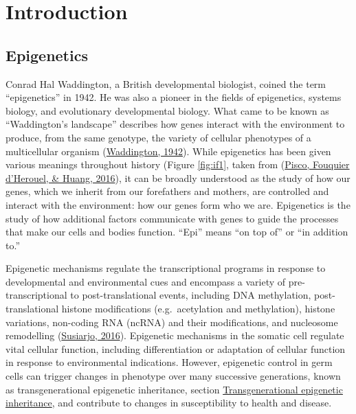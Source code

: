 \documentclass[12pt,twoside]{reedthesis}
\begin{document}
\hypertarget{intro}{%
\chapter*{Introduction}\label{intro}}

\hypertarget{epigenetics}{%
\section*{Epigenetics}\label{epigenetics}}

Conrad Hal Waddington, a British developmental biologist, coined the
term ``epigenetics'' in 1942. He was also a pioneer in the fields of
epigenetics, systems biology, and evolutionary developmental biology.
What came to be known as ``Waddington's landscape'' describes how genes
interact with the environment to produce, from the same genotype, the
variety of cellular phenotypes of a multicellular organism
(\protect\hyperlink{ref-waddington_1942}{Waddington, 1942}). While epigenetics has been given various meanings
throughout history (Figure \ref{fig:if1}, taken from (\protect\hyperlink{ref-pisco2016}{Pisco, Fouquier d'Herouel, \& Huang, 2016}), it
can be broadly understood as the study of how our genes, which we
inherit from our forefathers and mothers, are controlled and interact
with the environment: how our genes form who we are. Epigenetics is the
study of how additional factors communicate with genes to guide the
processes that make our cells and bodies function. ``Epi'' means ``on top
of'' or ``in addition to.''

Epigenetic mechanisms regulate the transcriptional programs in response
to developmental and environmental cues and encompass a variety of
pre-transcriptional to post-translational events, including DNA
methylation, post-translational histone modifications (e.g.~acetylation
and methylation), histone variations, non-coding RNA (ncRNA) and their
modifications, and nucleosome remodelling (\protect\hyperlink{ref-susiarjo2016}{Susiarjo, 2016}). Epigenetic
mechanisms in the somatic cell regulate vital cellular function,
including differentiation or adaptation of cellular function in response
to environmental indications. However, epigenetic control in germ cells
can trigger changes in phenotype over many successive generations, known
as transgenerational epigenetic inheritance, section \protect\hyperlink{tei}{Transgenerational
epigenetic inheritance}, and contribute to changes in
susceptibility to health and disease.
\end{document}
